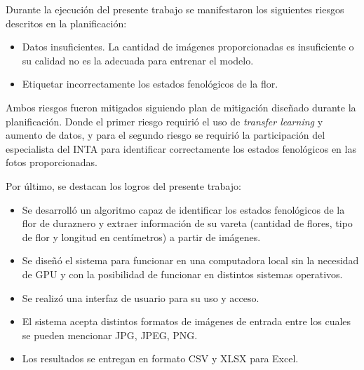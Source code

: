 Durante la ejecución del presente trabajo se manifestaron los siguientes riesgos descritos en la planificación:

\begin{itemize}
\item Datos insuficientes. La cantidad de imágenes proporcionadas es insuficiente o su calidad no es la adecuada para entrenar el modelo.
\item Etiquetar incorrectamente los estados fenológicos de la flor. 
\end{itemize}

Ambos riesgos fueron mitigados siguiendo plan de mitigación diseñado durante la planificación. Donde el primer riesgo requirió el uso de \textit{transfer learning} y aumento de datos, y para el segundo riesgo se requirió la participación del especialista del INTA para identificar correctamente los estados fenológicos en las fotos proporcionadas.

Por último, se destacan los logros del presente trabajo:

\begin{itemize}
\item Se desarrolló un algoritmo capaz de identificar los estados fenológicos de la flor de duraznero y extraer información de su vareta (cantidad de flores, tipo de flor y longitud en centímetros) a partir de imágenes.
\item Se diseñó el sistema para funcionar en una computadora local sin la necesidad de GPU y con la posibilidad de funcionar en distintos sistemas operativos.
\item Se realizó una interfaz de usuario para su uso y acceso.
\item El sistema acepta distintos formatos de imágenes de entrada entre los cuales  se pueden mencionar JPG, JPEG, PNG.
\item Los resultados se entregan en formato CSV y XLSX para Excel.
\end{itemize} 

%
%


